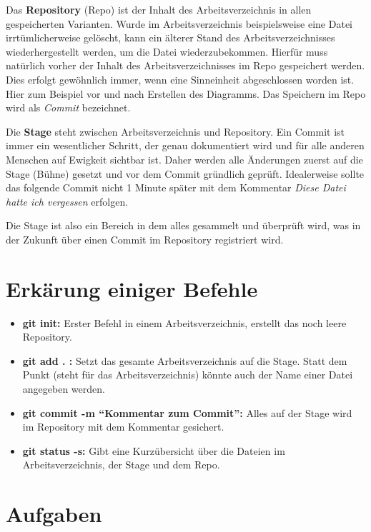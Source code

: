 \documentclass[10pt]{article}
\begin{document}
Das \textbf{Repository} (Repo) ist der Inhalt des Arbeitsverzeichnis in allen
gespeicherten Varianten. Wurde im Arbeitsverzeichnis beispielsweise
eine Datei irrtümlicherweise gelöscht, kann ein älterer Stand des
Arbeitsverzeichnisses wiederhergestellt werden, um die Datei
wiederzubekommen. Hierfür muss natürlich vorher der Inhalt des
Arbeitsverzeichnisses im Repo gespeichert werden. Dies erfolgt
gewöhnlich immer, wenn eine Sinneinheit abgeschlossen worden ist. Hier
zum Beispiel vor und nach Erstellen des Diagramms. Das Speichern im
Repo wird als \textsl{Commit} bezeichnet.

Die \textbf{Stage} steht zwischen Arbeitsverzeichnis und Repository.
Ein Commit ist immer ein wesentlicher Schritt, der genau dokumentiert
wird und für alle anderen Menschen auf Ewigkeit sichtbar ist. Daher
werden alle Änderungen zuerst auf die Stage (Bühne) gesetzt und vor
dem Commit gründlich geprüft. Idealerweise sollte das folgende Commit
nicht 1 Minute später mit dem Kommentar \textsl{Diese Datei hatte ich
  vergessen} erfolgen.

Die Stage ist also ein Bereich in dem alles gesammelt und überprüft
wird, was in der Zukunft über einen Commit im  Repository registriert wird.



\section{Erkärung einiger Befehle}
\begin{itemize}
\item \textbf{git init:} Erster Befehl in einem Arbeitsverzeichnis,
  erstellt das noch leere Repository.
\item \textbf{git add . :} Setzt das gesamte Arbeitsverzeichnis auf
  die Stage. Statt dem Punkt (steht für das Arbeitsverzeichnis) könnte
  auch der Name einer Datei angegeben werden.
\item \textbf{git commit -m \enquote{Kommentar zum Commit}:} Alles auf
  der Stage wird im Repository mit dem Kommentar gesichert.
\item \textbf{git status -s:} Gibt eine Kurzübersicht über die Dateien im Arbeitsverzeichnis, der Stage und dem Repo. 

\end{itemize}

\section{Aufgaben}
\end{document}
